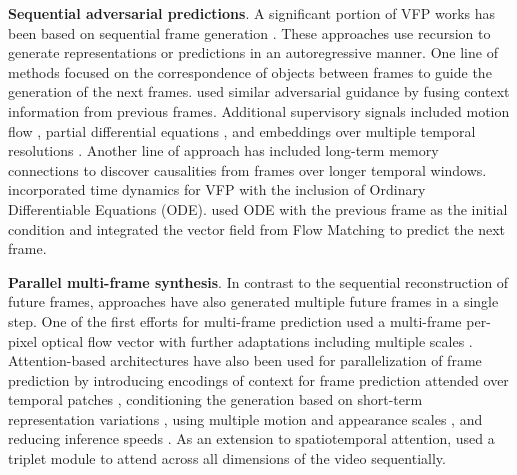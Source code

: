 \noindent
\textbf{Sequential adversarial predictions}. A significant portion of VFP works has been based on sequential frame generation . These approaches use recursion to generate representations or predictions in an autoregressive manner. One line of methods  focused on the correspondence of objects between frames to guide the generation of the next frames.  used similar adversarial guidance by fusing context information from previous frames. Additional supervisory signals included motion flow , partial differential equations , and embeddings over multiple temporal resolutions . Another line of approach  has included long-term memory connections to discover causalities from frames over longer temporal windows.  incorporated time dynamics for VFP with the inclusion of Ordinary Differentiable Equations (ODE).  used ODE with the previous frame as the initial condition and integrated the vector field from Flow Matching  to predict the next frame. 


\noindent
\textbf{Parallel multi-frame synthesis}. In contrast to the sequential reconstruction of future frames, approaches have also generated multiple future frames in a single step. One of the first efforts for multi-frame prediction  used a multi-frame per-pixel optical flow vector with further adaptations including multiple scales . Attention-based architectures have also been used for parallelization of frame prediction by introducing encodings of context for frame prediction attended over temporal patches , conditioning the generation based on short-term representation variations , using multiple motion and appearance scales , and reducing inference speeds . As an extension to spatiotemporal attention,  used a triplet module to attend across all dimensions of the video sequentially.

